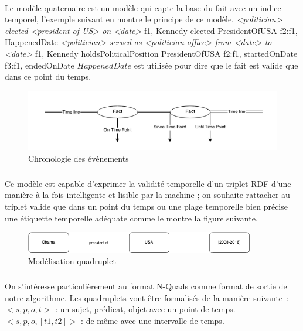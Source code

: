 \paragraph{}
Le modèle quaternaire est un modèle qui capte la base du fait avec un indice temporel, l'exemple suivant en montre le principe de ce modèle.
\newline
{\it <politician> elected <president of US> on <date>}
\newline
f1, Kennedy elected PresidentOfUSA 
\newline
f2:f1, HappenedDate
\newline
{\it <politician> served as <politician office> from <date> to <date>}
\newline
f1, Kennedy holdsPoliticalPosition PresidentOfUSA 
\newline
f2:f1, startedOnDate 
\newline
f3:f1, endedOnDate
\newline
$HappenedDate$ est utilisée pour dire que le fait est valide que dans ce point du temps.
\begin{figure}[H]
        \centering
                \centering
                \includegraphics[width=13cm]{timeline.png}
               \caption{Chronologie des événements}

\end{figure}
\subparagraph{}
Ce modèle est capable d'exprimer la validité temporelle d’un triplet RDF d’une manière à la fois intelligente et lisible par la machine ; on souhaite rattacher au triplet valide que dans un point du temps ou une plage temporelle bien précise une étiquette temporelle adéquate comme le montre la figure suivante.
\begin{figure}[H]
        \centering
                \centering
                \includegraphics[width=10cm]{obamaQuad.png}
               \caption{Modélisation quadruplet}

\end{figure}
\subparagraph{}
On s'intéresse particulièrement au format N-Quads comme format de sortie de notre algorithme. Les quadruplets vont être formalisés de la manière suivante~:
\newline
$<s,p,o,t>$ : un sujet, prédicat, objet avec un point de temps.
\newline
$<s,p,o,[t1,t2]>$ : de même avec une intervalle de temps.
